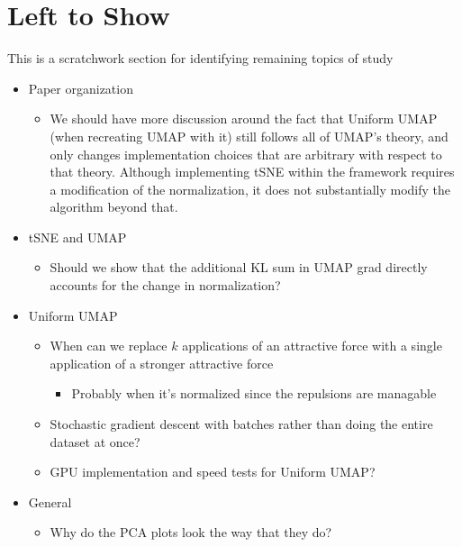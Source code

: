 \documentclass{article}
\theoremstyle{definition}
\begin{document}
\section{Left to Show}
This is a scratchwork section for identifying remaining topics of study
\begin{itemize}
    \item Paper organization
        \begin{itemize}
            \item We should have more discussion around the fact that Uniform UMAP (when recreating UMAP with it) still follows all of UMAP's theory, and only
                changes implementation choices that are arbitrary with respect to that theory. Although implementing tSNE within the framework requires
                a modification of the normalization, it does not substantially modify the algorithm beyond that.
        \end{itemize}
    \item tSNE and UMAP
        \begin{itemize}
            \item Should we show that the additional KL sum in UMAP grad directly accounts for the change in normalization?
        \end{itemize}
    \item Uniform UMAP
        \begin{itemize}
            \item When can we replace $k$ applications of an attractive force with a single application of a stronger attractive force
                \begin{itemize}
                    \item Probably when it's normalized since the repulsions are managable
                \end{itemize}
            \item Stochastic gradient descent with batches rather than doing the entire dataset at once?
            \item GPU implementation and speed tests for Uniform UMAP?
        \end{itemize}
    \item General
        \begin{itemize}
            \item Why do the PCA plots look the way that they do?
        \end{itemize}
\end{itemize}

\printbibliography
\end{document}
